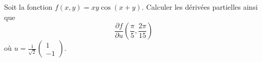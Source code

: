
\begin{exercice}\label{exoOutilsMath-0043}

    Soit la fonction $f(x,y)=xy\cos(x+y)$. Calculer les dérivées partielles ainsi que
    \begin{equation}
        \frac{ \partial f }{ \partial u }(\frac{ \pi }{ 5 },\frac{ 2\pi }{ 15 })
    \end{equation}
    où $u=\frac{1}{ \sqrt{2} }\begin{pmatrix}
        1    \\ 
        -1    
    \end{pmatrix}$.
    

\end{exercice}
